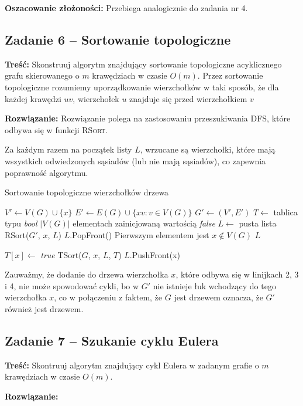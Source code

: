 \textbf{Oszacowanie złożoności:} Przebiega analogicznie do zadania nr 4.

\subsection{Zadanie 6 -- Sortowanie topologiczne}
\textbf{Treść: } Skonstruuj algorytm znajdujący 
sortowanie topologiczne acyklicznego grafu skierowanego 
o $m$ krawędziach w czasie $O(m)$. 
Przez sortowanie topologiczne rozumiemy uporządkowanie 
wierzchołków w taki sposób, że dla
każdej krawędzi $uv$, wierzchołek $u$ znajduje się przed 
wierzchołkiem $v$

\textbf{Rozwiązanie:} Rozwiązanie polega na zastosowaniu przeszukiwania DFS, które
odbywa się w funkcji \textsc{RSort}.

Za każdym razem na początek listy $L$, wrzucane są wierzchołki, 
które mają wszystkich odwiedzonych sąsiadów (lub nie mają sąsiadów),
co zapewnia poprawność algorytmu.

\begin{algorithm}[H]
	\caption{Sortowanie topologiczne wierzchołków drzewa}
	\begin{algorithmic}[1]
		\State $V' \gets V(G) \cup \{x\}$
		\State $E' \gets E(G) \cup \{xv : v \in V(G)\}$
		\State $G' \gets (V', E')$
		\State $T \gets$ tablica typu \textit{bool} $|V(G)|$ elementach zainicjowaną wartością 
		\textit{false}
		\State $L \gets$ pusta lista
		\State RSort($G'$, $x$, $L$)
		\State $L$.PopFront() \Comment Pierwszym elementem jest $x \not \in V(G)$
		\State \Return $L$
		\EndProcedure
		
		\State $T[x] \gets$ \textit{true}
		\State TSort($G$, $x$, $L$, $T$)
		\EndIf
		\EndWhile
		\State $L$.PushFront(x)
		\EndProcedure
	\end{algorithmic}
	\label{alg:Zadanie26}
\end{algorithm}

Zauważmy, że dodanie do drzewa wierzchołka $x$, które odbywa się w linijkach 2, 3 i 4, nie może spowodować
cykli, bo w $G'$ nie istnieje łuk wchodzący do tego wierzchołka $x$, co w połączeniu z faktem, 
że $G$ jest drzewem oznacza, że $G'$ również jest drzewem.

\subsection{Zadanie 7 -- Szukanie cyklu Eulera}
\textbf{Treść: } Skontruuj algorytm znajdujący cykl Eulera 
w zadanym grafie o $m$ krawędziach w czasie $O(m)$.

\textbf{Rozwiązanie: }
